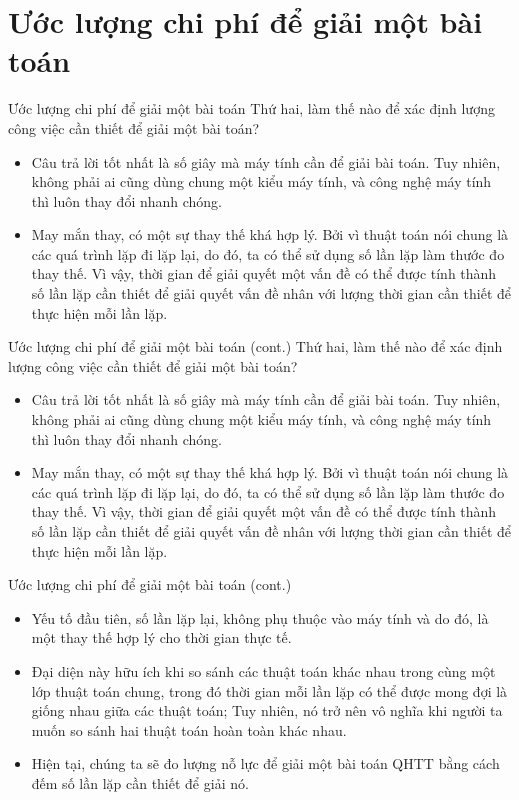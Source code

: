 \documentclass[10pt]{beamer}
\begin{document}
\section{Ước lượng chi phí để giải một bài toán}
\begin{frame}{Ước lượng chi phí để giải một bài toán}
Thứ hai, làm thế nào để xác định lượng công việc cần thiết để giải một bài toán?
\begin{itemize}
\item Câu trả lời tốt nhất là số giây mà máy tính cần để giải bài toán. Tuy nhiên, không phải ai cũng dùng chung một kiểu máy tính, và công nghệ máy tính thì luôn thay đổi nhanh chóng.
\item May mắn thay, có một sự thay thế khá hợp lý. Bởi vì thuật toán nói chung là các quá trình lặp đi lặp lại, do đó, ta có thể sử dụng số lần lặp làm thước đo thay thế. Vì vậy, thời gian để giải quyết một vấn đề có thể được tính thành số lần lặp cần thiết để giải quyết vấn đề nhân với lượng thời gian cần thiết để thực hiện mỗi lần lặp.
\end{itemize}
\end{frame}

\begin{frame}{Ước lượng chi phí để giải một bài toán (cont.)}
Thứ hai, làm thế nào để xác định lượng công việc cần thiết để giải một bài toán?
\begin{itemize}
\item Câu trả lời tốt nhất là số giây mà máy tính cần để giải bài toán. Tuy nhiên, không phải ai cũng dùng chung một kiểu máy tính, và công nghệ máy tính thì luôn thay đổi nhanh chóng.
\item May mắn thay, có một sự thay thế khá hợp lý. Bởi vì thuật toán nói chung là các quá trình lặp đi lặp lại, do đó, ta có thể sử dụng số lần lặp làm thước đo thay thế. Vì vậy, thời gian để giải quyết một vấn đề có thể được tính thành số lần lặp cần thiết để giải quyết vấn đề nhân với lượng thời gian cần thiết để thực hiện mỗi lần lặp.
\end{itemize}
\end{frame}

\begin{frame}{Ước lượng chi phí để giải một bài toán (cont.)}  
\begin{itemize}
\item Yếu tố đầu tiên, số lần lặp lại, không phụ thuộc vào máy tính và do đó, là một thay thế hợp lý cho thời gian thực tế. 
\item Đại diện này hữu ích khi so sánh các thuật toán khác nhau trong cùng một lớp thuật toán chung, trong đó thời gian mỗi lần lặp có thể được mong đợi là giống nhau giữa các thuật toán; Tuy nhiên, nó trở nên vô nghĩa khi người ta muốn so sánh hai thuật toán hoàn toàn khác nhau.
\item  Hiện tại, chúng ta sẽ đo lượng nỗ lực để giải một bài toán QHTT bằng cách đếm số lần lặp cần thiết để giải nó.
\end{itemize}
\end{frame}
\end{document}
